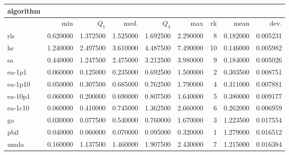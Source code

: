 \begin{tabular}{@{}l*{5}{>{{}}N{1}{2}}>{{}}N{2}{0}N{1}{3}N{1}{3}@{}}
\toprule
{algorithm} &  &  \\
\midrule
& {min} & {$Q_1$} & {med.} & {$Q_3$} & {max} & {rk} & {mean} & {dev.} \\
\midrule
rls & 0.620000 & 1.372500 & 1.525000 & 1.692500 & 2.290000 & 8 & 0.182000 & 0.005231 \\
 hc & 1.240000 & 2.497500 & 3.610000 & 4.487500 & 7.490000 & 10 & 0.146000 & 0.005982 \\
 sa & 0.440000 & 1.247500 & 2.475000 & 3.212500 & 3.980000 & 9 & 0.184000 & 0.005026 \\
 ea-1p1 & 0.060000 & 0.125000 & 0.235000 & 0.692500 & 1.500000 & 2 & 0.303500 & 0.008751 \\
 ea-1p10 & 0.050000 & 0.307500 & 0.685000 & 0.762500 & 1.790000 & 4 & 0.311000 & 0.007881 \\
 ea-10p1 & 0.060000 & 0.200000 & 0.690000 & 0.807500 & 1.640000 & 5 & 0.380000 & 0.009177 \\
 ea-1c10 & 0.060000 & 0.410000 & 0.745000 & 1.362500 & 2.660000 & 6 & 0.262000 & 0.006959 \\
 ga & {\color{blue}} 0.030000 & 0.077500 & 0.540000 & 0.760000 & 1.670000 & 3 & 1.223500 & 0.017554 \\
 pbil & 0.040000 & {\color{blue}} 0.060000 & {\color{blue}} 0.070000 & {\color{blue}} 0.095000 & {\color{blue}} 0.320000 & 1 & 1.279000 & 0.016512 \\
 umda & 0.160000 & 1.137500 & 1.460000 & 1.907500 & 2.430000 & 7 & 1.215000 & 0.016384 \\
 \bottomrule
\end{tabular}
